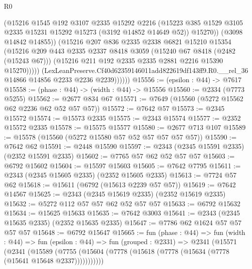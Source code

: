 \begin{lexlean}{R0}
\begin{coremodule}
                      (@15216
                        @1545
                        @192
                        @3107
                        @2335
                        @15292
                        @2216
                        (@15223
                          @385
                          @1529
                          @3105
                          @2335
                          @15231
                          @15292
                          @15273
                          (@3192 @14852 @14649 @52))
                        @15270))
                    (@3098 @14842 @14855))
                  (@15216
                    @207
                    @836
                    @2335
                    @2338
                    @6821
                    @15210
                    @15354
                    (@15216
                      @209
                      @443
                      @2335
                      @2337
                      @8418
                      @3059
                      (@15240 @67 @8418 (@2482 (@15243 @67)))
                      (@15216 @211 @192 @2335 @2335 @2881 @2216 @15390 @15270)))))
              (LexLeanPreserve.Cf40d62359146011add822619df143ff9.R0.__rel_36
                @14866
                @14856
                @2233
                @2236
                @2239))))))
@15556 := (epsilon : @44) -> @7617
@15558 := (phase : @44) -> (width : @44) -> @15556
@15560 := @2334 (@7773 @5255)
@15562 := @2677 @834 @67
@15571 := @7649 (@15560 (@5272 @15562 @62 @2236 @62 @52 @57 @57))
@15572 := @7642 @57
@15573 := @2345 @15572
@15574 := @15573 @2335
@15575 := @2343 @15574
@15577 := @2352 @15572 @2335
@15578 := @15575 @15577
@15580 := @2677 @713 @107
@15589 := @15578 (@15560 (@5272 @15580 @57 @52 @57 @57 @57 @57))
@15590 := @7642 @62
@15591 := @2448 @15590
@15597 := @2343 (@2345 @15591 @2335) (@2352 @15591 @2335)
@15602 := @7765 @57 @62 @52 @57 @57
@15603 := @6792 @15602
@15604 := @15597 @15603
@15605 := @7642 @7795
@15611 := @2343 (@2345 @15605 @2335) (@2352 @15605 @2335)
@15613 := @7724 @57 @62
@15618 := @15611 (@6792 (@15613 @2239 @57 @57))
@15619 := @7642 @14567
@15625 := @2343 (@2345 @15619 @2335) (@2352 @15619 @2335)
@15632 := @5272 @112 @57 @57 @62 @52 @57 @57
@15633 := @6792 @15632
@15634 := @15625 @15633
@15635 := @7642 @3003
@15641 := @2343 (@2345 @15635 @2335) (@2352 @15635 @2335)
@15647 := @7786 @62 @1624 @57 @57 @57 @57
@15648 := @6792 @15647
@15665 := fun (phase : @44) =>
  fun (width : @44) =>
  fun (epsilon : @44) =>
  fun (grouped : @2331) =>
  @2341
    (@15571
      (@2341
        (@15589 (@7755 (@15604 (@7778 (@15618 (@7778 (@15634 (@7778 (@15641 @15648 @2337)))))))))))

\end{coremodule}
\end{lexlean}
